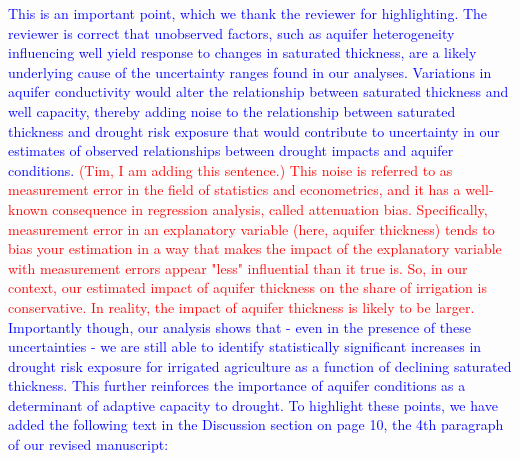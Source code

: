 \documentclass[
]{article}
\begin{document}
\begin{itemize}
  \textcolor{blue}{This is an important point, which we thank the reviewer for highlighting. The reviewer is correct that unobserved factors, such as aquifer heterogeneity influencing well yield response to changes in saturated thickness, are a likely underlying cause of the uncertainty ranges found in our analyses. Variations in aquifer conductivity would alter the relationship between saturated thickness and well capacity, thereby adding noise to the relationship between saturated thickness and drought risk exposure that would contribute to uncertainty in our estimates of observed relationships between drought impacts and aquifer conditions. \textcolor{red}{(Tim, I am adding this sentence.) This noise is referred to as measurement error in the field of statistics and econometrics, and it has a well-known consequence in regression analysis, called attenuation bias. Specifically, measurement error in an explanatory variable (here, aquifer thickness) tends to bias your estimation in a way that makes the impact of the explanatory variable with measurement errors appear "less" influential than it true is. So, in our context, our estimated impact of aquifer thickness on the share of irrigation is conservative. In reality, the impact of aquifer thickness is likely to be larger.} Importantly though, our analysis shows that - even in the presence of these uncertainties - we are still able to identify statistically significant increases in drought risk exposure for irrigated agriculture as a function of declining saturated thickness. This further reinforces the importance of aquifer conditions as a determinant of adaptive capacity to drought. To highlight these points, we have added the following text in the Discussion section on page 10, the 4th paragraph of our revised manuscript:}
\end{itemize}
\end{document}
